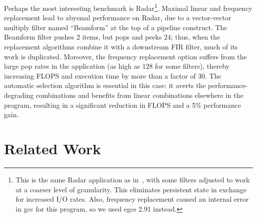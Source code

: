 \documentclass{sig-alternate}
\begin{document}
{Perhaps the most interesting benchmark is Radar\footnote{\small This
is the same Radar application as in~\cite{streamit-asplos}, with some
filters adjusted to work at a coarser level of granularity.  This
eliminates persistent state in exchange for increased I/O rates.
Also, frequency replacement caused an internal error in gcc for this
program, so we used egcs 2.91 instead.}.  Maximal linear and frequency
replacement lead to abysmal performance on Radar, due to a
vector-vector multiply filter named ``Beamform'' at the top of a pipeline
construct.  The Beamform filter pushes 2 items, but pops and peeks 24;
thus, when the replacement algorithms combine it with a downstream FIR
filter, much of its work is duplicated.  Moreover, the frequency
replacement option suffers from the large pop rates in the application
(as high as 128 for some filters), thereby increasing FLOPS and
execution time by more than a factor of 30.  The automatic selection
algorithm is essential in this case: it averts the
performance-degrading combinations and benefits from linear
combinations elsewhere in the program, resulting in a significant
reduction in FLOPS and a 5\% performance gain.


\section{Related Work}
\label{sec:related}

}
\end{document}
